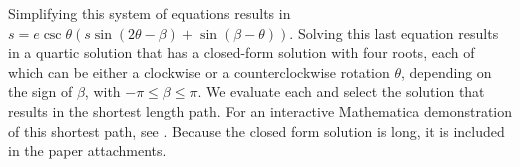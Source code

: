 Simplifying this system of equations results in $s=e \csc \theta (s \sin(2 \theta-\beta)+\sin(\beta-\theta))$. Solving this last equation results in a quartic solution that has a closed-form solution with four roots, each of which can be either a clockwise or a counterclockwise rotation $\theta$, depending on the sign of $\beta$, with $-\pi\leq\beta\leq\pi$. We evaluate each and select the solution that results in the shortest length path. %
 For an interactive Mathematica demonstration of this shortest path, see \cite{BeckerShortestPath}. Because the closed form solution is long, it is included in the paper attachments.
 
 

 
 
  
 